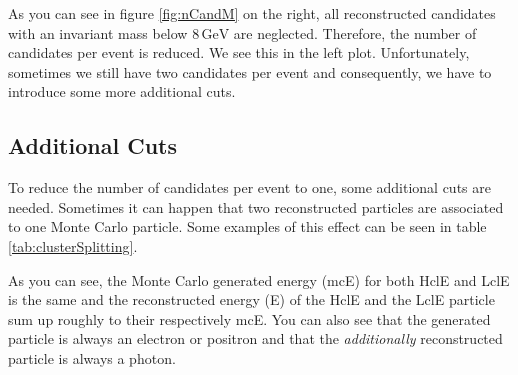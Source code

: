 \documentclass[a4paper,11pt,twosided,final,german,openbib,pdftex,listof=totoc,bibliography=totoc]{scrbook}
\begin{document}
As you can see in figure \ref{fig:nCandM} on the right, all reconstructed candidates with an invariant mass below $8\,\textrm{GeV}$ are neglected. Therefore, the number of candidates per event is reduced. We see this in the left plot. Unfortunately, sometimes we still have two candidates per event and consequently, we have to introduce some more additional cuts.



\subsection{Additional Cuts}

To reduce the number of candidates per event to one, some additional cuts are needed. Sometimes it can happen that two reconstructed particles are associated to one Monte Carlo particle. Some examples of this effect can be seen in table \ref{tab:clusterSplitting}. 


\begin{table}[h!]
	\centering
	\caption[Cluster Splitting Examples]{Some examples for events with cluster splitting. mcE is the same for LclE and HclE. The energies are in GeV. }
	\label{tab:clusterSplitting}
\end{table}

As you can see, the Monte Carlo generated energy (mcE) for both HclE and LclE is the same and the reconstructed energy (E) of the HclE and the LclE particle sum up roughly to their respectively mcE. You can also see that the generated particle is always an electron or positron and that the \textit{additionally} reconstructed particle is always a photon.
\end{document}
